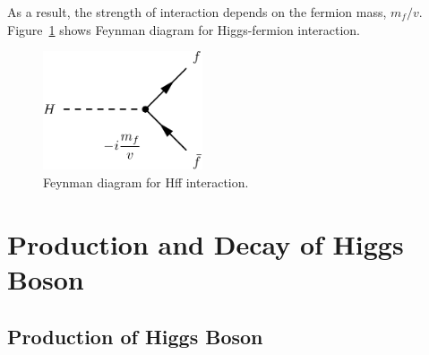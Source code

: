 As a result, the strength of interaction depends on the fermion mass, $m_f / v$. 
Figure~\ref{fig:fd_HFFterm} shows Feynman diagram for Higgs-fermion interaction.    
\begin{figure}[htp]
\centering
\includegraphics[height=3.5cm]{figures/FD_HFFterm.pdf}
\caption{ Feynman diagram for Hff interaction.}
\label{fig:fd_HFFterm}
\end{figure}





\newpage
\section{Production and Decay of Higgs Boson}


\subsection{Production of Higgs Boson}

